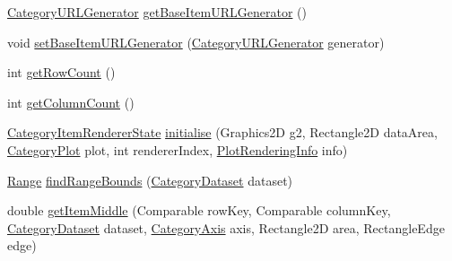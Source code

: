 \begin{DoxyCompactItemize}
\item 
\mbox{\hyperlink{interfaceorg_1_1jfree_1_1chart_1_1urls_1_1_category_u_r_l_generator}{Category\+U\+R\+L\+Generator}} \mbox{\hyperlink{classorg_1_1jfree_1_1chart_1_1renderer_1_1category_1_1_abstract_category_item_renderer_ac9003c1ec9ad1cc03e1beecca61e6bf1}{get\+Base\+Item\+U\+R\+L\+Generator}} ()
\item 
void \mbox{\hyperlink{classorg_1_1jfree_1_1chart_1_1renderer_1_1category_1_1_abstract_category_item_renderer_a5164152d258bec58dcd516d7293e6ce8}{set\+Base\+Item\+U\+R\+L\+Generator}} (\mbox{\hyperlink{interfaceorg_1_1jfree_1_1chart_1_1urls_1_1_category_u_r_l_generator}{Category\+U\+R\+L\+Generator}} generator)
\item 
int \mbox{\hyperlink{classorg_1_1jfree_1_1chart_1_1renderer_1_1category_1_1_abstract_category_item_renderer_a80f48dcced9be241cf9dd142e1a6f2a7}{get\+Row\+Count}} ()
\item 
int \mbox{\hyperlink{classorg_1_1jfree_1_1chart_1_1renderer_1_1category_1_1_abstract_category_item_renderer_adb86bc0337783bc54a85617ddb333702}{get\+Column\+Count}} ()
\item 
\mbox{\hyperlink{classorg_1_1jfree_1_1chart_1_1renderer_1_1category_1_1_category_item_renderer_state}{Category\+Item\+Renderer\+State}} \mbox{\hyperlink{classorg_1_1jfree_1_1chart_1_1renderer_1_1category_1_1_abstract_category_item_renderer_a9cfe3bcab2e0572bf9e9c5ca38c63346}{initialise}} (Graphics2D g2, Rectangle2D data\+Area, \mbox{\hyperlink{classorg_1_1jfree_1_1chart_1_1plot_1_1_category_plot}{Category\+Plot}} plot, int renderer\+Index, \mbox{\hyperlink{classorg_1_1jfree_1_1chart_1_1plot_1_1_plot_rendering_info}{Plot\+Rendering\+Info}} info)
\item 
\mbox{\hyperlink{classorg_1_1jfree_1_1data_1_1_range}{Range}} \mbox{\hyperlink{classorg_1_1jfree_1_1chart_1_1renderer_1_1category_1_1_abstract_category_item_renderer_aba6ace35854f96515fecf819b4fa20f7}{find\+Range\+Bounds}} (\mbox{\hyperlink{interfaceorg_1_1jfree_1_1data_1_1category_1_1_category_dataset}{Category\+Dataset}} dataset)
\item 
double \mbox{\hyperlink{classorg_1_1jfree_1_1chart_1_1renderer_1_1category_1_1_abstract_category_item_renderer_ac7735a16d0efdbaaf7e7542a455e763b}{get\+Item\+Middle}} (Comparable row\+Key, Comparable column\+Key, \mbox{\hyperlink{interfaceorg_1_1jfree_1_1data_1_1category_1_1_category_dataset}{Category\+Dataset}} dataset, \mbox{\hyperlink{classorg_1_1jfree_1_1chart_1_1axis_1_1_category_axis}{Category\+Axis}} axis, Rectangle2D area, Rectangle\+Edge edge)

\end{DoxyCompactItemize}

